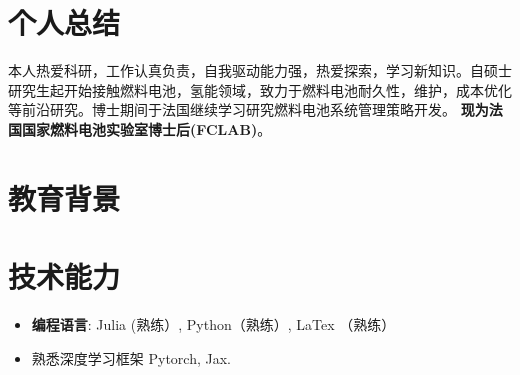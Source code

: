 \documentclass{resume}
\begin{document}


{}
 
\section{个人总结}
本人热爱科研，工作认真负责，自我驱动能力强，热爱探索，学习新知识。自硕士研究生起开始接触燃料电池，氢能领域，致力于燃料电池耐久性，维护，成本优化等前沿研究。博士期间于法国继续学习研究燃料电池系统管理策略开发。 
\textbf{现为法国国家燃料电池实验室博士后(FCLAB)}。

\section{教育背景}

\section{技术能力}
\begin{itemize}[parsep=0.2ex]
  \item \textbf{编程语言}: Julia (熟练）, Python（熟练）, LaTex （熟练）
  \item 熟悉深度学习框架 Pytorch, Jax.
\end{itemize}
\end{document}
